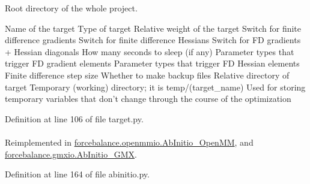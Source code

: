 \-Root directory of the whole project. 

\-Name of the target \-Type of target \-Relative weight of the target \-Switch for finite difference gradients \-Switch for finite difference \-Hessians \-Switch for \-F\-D gradients + \-Hessian diagonals \-How many seconds to sleep (if any) \-Parameter types that trigger \-F\-D gradient elements \-Parameter types that trigger \-F\-D \-Hessian elements \-Finite difference step size \-Whether to make backup files \-Relative directory of target \-Temporary (working) directory; it is temp/(target\-\_\-name) \-Used for storing temporary variables that don't change through the course of the optimization 

\-Definition at line 106 of file target.\-py.

\hypertarget{classforcebalance_1_1abinitio_1_1AbInitio_a32164696f808febd50eafae10d10a7e7}{
\paragraph[{topology\-\_\-flag}]{}}\label{classforcebalance_1_1abinitio_1_1AbInitio_a32164696f808febd50eafae10d10a7e7}


\-Reimplemented in \hyperlink{classforcebalance_1_1openmmio_1_1AbInitio__OpenMM_a1d9b198527a222dd62c1df0818cb3283}{forcebalance.\-openmmio.\-Ab\-Initio\-\_\-\-Open\-M\-M}, and \hyperlink{classforcebalance_1_1gmxio_1_1AbInitio__GMX_aed68d5926a58dd23476835caaa5722b3}{forcebalance.\-gmxio.\-Ab\-Initio\-\_\-\-G\-M\-X}.



\-Definition at line 164 of file abinitio.\-py.

\hypertarget{classforcebalance_1_1abinitio_1_1AbInitio_a36857e469f48d8bddbd3b288a92cac10}{
\paragraph[{tq\-\_\-err}]{}}\label{classforcebalance_1_1abinitio_1_1AbInitio_a36857e469f48d8bddbd3b288a92cac10}


